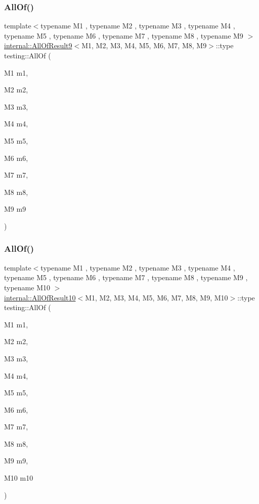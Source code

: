 \mbox{\label{namespacetesting_aaecf2bd8eb7c68b119f9b81a01942b7f}} 
\subsubsection{\texorpdfstring{AllOf()}{AllOf()}\hspace{0.1cm}{\footnotesize\ttfamily [8/9]}}
{\footnotesize\ttfamily template$<$typename M1 , typename M2 , typename M3 , typename M4 , typename M5 , typename M6 , typename M7 , typename M8 , typename M9 $>$ \\
\mbox{\hyperlink{structtesting_1_1internal_1_1AllOfResult9}{internal\+::\+All\+Of\+Result9}}$<$M1, M2, M3, M4, M5, M6, M7, M8, M9$>$\+::type testing\+::\+All\+Of (\begin{DoxyParamCaption}\item[{M1}]{m1,  }\item[{M2}]{m2,  }\item[{M3}]{m3,  }\item[{M4}]{m4,  }\item[{M5}]{m5,  }\item[{M6}]{m6,  }\item[{M7}]{m7,  }\item[{M8}]{m8,  }\item[{M9}]{m9 }\end{DoxyParamCaption})\hspace{0.3cm}{\ttfamily [inline]}}

\mbox{\label{namespacetesting_a9939c08664efeed0c1983090115f7ecb}} 
\subsubsection{\texorpdfstring{AllOf()}{AllOf()}\hspace{0.1cm}{\footnotesize\ttfamily [9/9]}}
{\footnotesize\ttfamily template$<$typename M1 , typename M2 , typename M3 , typename M4 , typename M5 , typename M6 , typename M7 , typename M8 , typename M9 , typename M10 $>$ \\
\mbox{\hyperlink{structtesting_1_1internal_1_1AllOfResult10}{internal\+::\+All\+Of\+Result10}}$<$M1, M2, M3, M4, M5, M6, M7, M8, M9, M10$>$\+::type testing\+::\+All\+Of (\begin{DoxyParamCaption}\item[{M1}]{m1,  }\item[{M2}]{m2,  }\item[{M3}]{m3,  }\item[{M4}]{m4,  }\item[{M5}]{m5,  }\item[{M6}]{m6,  }\item[{M7}]{m7,  }\item[{M8}]{m8,  }\item[{M9}]{m9,  }\item[{M10}]{m10 }\end{DoxyParamCaption})\hspace{0.3cm}{\ttfamily [inline]}}

